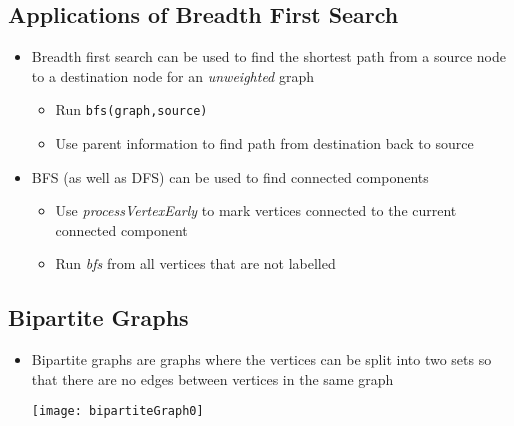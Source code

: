 \begin{slide}
\section[-1]{Applications of Breadth First Search}

\begin{PauseHighLight}
  \begin{itemize}
  \item Breadth first search can be used to find the shortest path from
    a source node to a destination node for an \emph{unweighted} graph
    \begin{itemize}\squeeze
    \item Run \texttt{bfs(graph,source)}
    \item Use parent information to find path from destination back to
      source\pause
    \end{itemize}
  \item BFS (as well as DFS) can be used to find connected components
    \begin{itemize}
    \item Use \textit{processVertexEarly} to mark vertices connected to
      the current connected component
    \item Run \textit{bfs} from all vertices that are not labelled\pause
    \end{itemize}
  \end{itemize}
\end{PauseHighLight}

\end{slide}


\begin{slide}
\section[-1]{Bipartite Graphs}

\begin{PauseHighLight}
  \begin{itemize}
  \item Bipartite graphs are graphs where the vertices can be split into
    two sets so that there are no edges between vertices in the same
    graph
    \begin{center}
      \texttt{[image: bipartiteGraph0]}\pause
      \pauseb
    \end{center}
  \end{itemize}
\end{PauseHighLight}

\end{slide}

